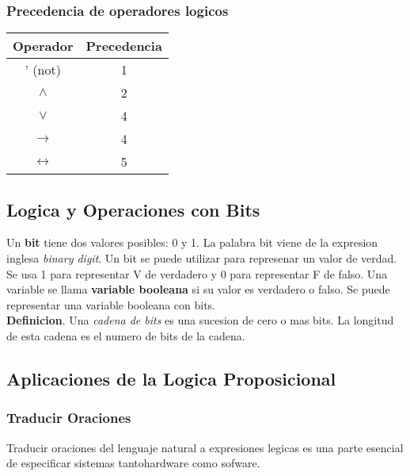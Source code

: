 \documentclass[]{article}
\begin{document}
\subsubsection*{Precedencia de operadores logicos}\label{sec:precedenda}

\begin{table}[H]
	\begin{center}
		\label{tab:precedencia}
		\begin{tabular}{c|c}
		Operador & Precedencia \\
		\hline
		' (not) & 1 \\
		$\wedge$ & 2 \\
		$\vee$ & 4 \\
		$\rightarrow$ & 4 \\
		$\leftrightarrow$ & 5 \\
		\end{tabular}
	\end{center}
\end{table}

\subsection*{Logica y Operaciones con Bits}\label{sec:operaciones-bits}

Un \textbf{bit} tiene dos valores posibles: 0 y 1. La palabra bit viene de la expresion inglesa \textit{binary digit}. Un bit se puede utilizar para represenar un valor de verdad. Se usa 1 para representar V de verdadero y 0 para representar F de falso. Una variable se llama \textbf{variable booleana} si su valor es verdadero o falso. Se puede representar una variable booleana con bits.\\

\textbf{Definicion}. Una \textit{cadena de bits} es una sucesion de cero o mas bits. La longitud de esta cadena es el numero de bits de la cadena.

\subsection{Aplicaciones de la Logica Proposicional}

\subsubsection*{Traducir Oraciones}

Traducir oraciones del lenguaje natural a expresiones legicas es una parte esencial de especificar sistemas tantohardware como sofware.
\end{document}
